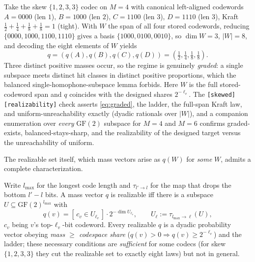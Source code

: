 \documentclass[sigconf,nonacm,anonymous,balance=false]{acmart}
\newcommand{\GF}{\mathrm{GF}(2)}
\newcommand{\W}{W}                          %
\begin{document}
\begin{example}
\label{ex:graded}
Take the skew $\{1,2,3,3\}$ codec on $M = 4$ with canonical left-aligned codewords $A =
0000$ (len $1$), $B = 1000$ (len $2$), $C = 1100$ (len $3$), $D = 1110$ (len $3$), Kraft
$\tfrac12 + \tfrac14 + \tfrac18 + \tfrac18 = 1$ (tight). With $\W$ the span of all four
stored codewords, reducing $\{0000, 1000, 1100, 1110\}$ gives a basis $\{1000, 0100,
0010\}$, so $\dim \W = 3$, $|\W| = 8$, and decoding the eight elements of $\W$ yields
\[
  q = (q(A), q(B), q(C), q(D)) = (\tfrac12, \tfrac14, \tfrac18, \tfrac18).
\]
Three distinct positive masses occur, so the regime is genuinely \emph{graded}: a single
subspace meets distinct hit classes in distinct positive proportions, which the balanced
single-homophone-subspace lemma forbids. Here $\W$ is the full stored-codeword span and
$q$ coincides with the designed shares $2^{-\ell_v}$. The \texttt{[skewed][realizability]}
check asserts \eqref{eq:graded}, the ladder, the full-span Kraft law, and uniform-unreachability
exactly (dyadic rationals over $|\W|$), and a companion enumeration over \emph{every}
$\GF$ subspace for $M = 4$ and $M = 6$ confirms graded-exists, balanced-stays-sharp, and
the realizability of the designed target versus the unreachability of uniform.
\end{example}

The realizable set itself, which mass vectors arise as $q(\W)$ for \emph{some} $\W$, admits
a complete characterization.

\begin{theorem}
\label{thm:realizable}
Write $l_{\max}$ for the longest code length and $\tau_{l' \to l}$ for the map that drops the
bottom $l' - l$ bits. A mass vector $q$ is realizable iff there is a subspace $U \subseteq
\GF^{l_{\max}}$ with
\[
  q(v) = [\, c_v \in U_{\ell_v} \,] \cdot 2^{-\dim U_{\ell_v}},
  \qquad U_\ell := \tau_{l_{\max} \to \ell}(U),
\]
$c_v$ being $v$'s top-$\ell_v$-bit codeword. Every realizable $q$ is a dyadic probability
vector obeying \emph{mass $\ge$ codespace share} ($q(v) > 0 \Rightarrow q(v) \ge 2^{-\ell_v}$)
and the ladder; these necessary conditions are \emph{sufficient} for some codecs (for skew
$\{1,2,3,3\}$ they cut the realizable set to exactly eight laws) but not in general.
\end{theorem}
\end{document}
